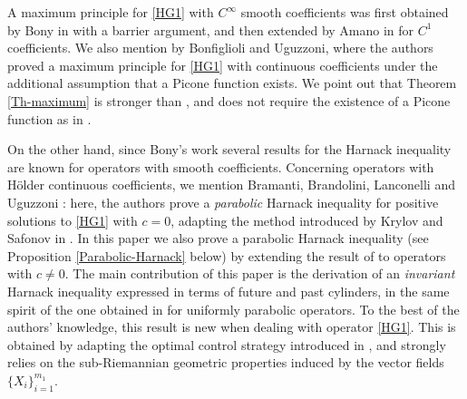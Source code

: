 \documentclass[11pt,a4paper]{article}
\numberwithin{equation}{section}
\begin{document}
A maximum principle for \eqref{HG1} with $C^\infty$ smooth coefficients was first obtained by Bony in \cite{bony1969principe} with a barrier argument, and then extended by Amano in \cite{amano1979maximum} for  $C^1$ coefficients. We also mention \cite{bonfiglioli2006maximum} by Bonfiglioli and Uguzzoni, where the authors proved a maximum principle for \eqref{HG1} with continuous coefficients under the additional assumption that a Picone function exists. We point out that Theorem \ref{Th-maximum} is stronger than \cite{amano1979maximum}, and does not require the existence of a Picone function as in \cite{bonfiglioli2006maximum}.

On the other hand, since Bony's work \cite{bony1969principe} several results for the Harnack inequality are known for operators with smooth coefficients. Concerning operators with H\"older continuous coefficients, we mention Bramanti, Brandolini, Lanconelli and Uguzzoni \cite{bramanti2010non}: here, the authors prove a \emph{parabolic} Harnack inequality for positive solutions to \eqref{HG1} with $c=0$, adapting the method introduced by Krylov and Safonov in \cite{krylov1981certain}. 
In this paper we also prove a parabolic Harnack inequality (see Proposition \ref{Parabolic-Harnack} below) by extending the result of \cite{bramanti2010non} to operators with $c\neq 0$. The main contribution of this paper is the derivation of an \emph{invariant} Harnack inequality expressed in terms of future and past cylinders, in the same spirit of the one obtained in \cite{malagoli} for uniformly parabolic operators. To the best of the authors’ knowledge, this result is new when dealing with operator \eqref{HG1}. This is obtained by adapting the optimal control strategy introduced in \cite{boscain}, and strongly relies on the sub-Riemannian geometric properties induced by the vector fields $\{X_i\}_{i=1}^{m_1}$.

\medskip
\end{document}
